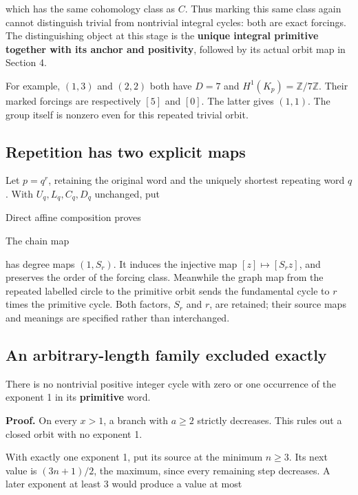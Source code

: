 which has the same cohomology class as \(C\). Thus marking this same
class again cannot distinguish trivial from nontrivial integral cycles:
both are exact forcings. The distinguishing object at this stage is the
\textbf{unique integral primitive together with its anchor and
positivity}, followed by its actual orbit map in Section 4.

For example, \((1,3)\) and \((2,2)\) both have \(D=7\) and
\(H^1(K_p)=\mathbb Z/7\mathbb Z\). Their marked forcings are
respectively \([5]\) and \([0]\). The latter gives \((1,1)\). The group
itself is nonzero even for this repeated trivial orbit.

\subsection{Repetition has two explicit maps}

Let \(p=q^r\), retaining the original word and the uniquely shortest
repeating word \(q\). With \(U_q,L_q,C_q,D_q\) unchanged, put


Direct affine composition proves


The chain map


has degree maps \((1,S_r)\). It induces the injective map
\([z]\mapsto[S_rz]\), and preserves the order of the forcing class.
Meanwhile the graph map from the repeated labelled circle to the
primitive orbit sends the fundamental cycle to \(r\) times the primitive
cycle. Both factors, \(S_r\) and \(r\), are retained; their source maps
and meanings are specified rather than interchanged.

\subsection{An arbitrary-length family excluded exactly}

There is no nontrivial positive integer cycle with zero or one
occurrence of the exponent 1 in its \textbf{primitive} word.

\textbf{Proof.} On every \(x>1\), a branch with \(a\ge2\) strictly
decreases. This rules out a closed orbit with no exponent 1.

With exactly one exponent 1, put its source at the minimum \(n\ge3\).
Its next value is \((3n+1)/2\), the maximum, since every remaining step
decreases. A later exponent at least 3 would produce a value at most

